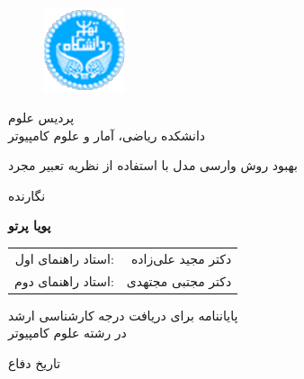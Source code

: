 \documentclass[12pt]{report}
\begin{document}

\begin{figure}
\centering
\includegraphics[height=2.5cm]{UT-Logo.pdf}
\end{figure}

\begin{center}
پردیس علوم
\\
دانشکده ریاضی، آمار و علوم کامپیوتر
\end{center}

\begin{center}
\end{center}

\begin{center}
\huge{بهبود روش وارسی مدل با استفاده از نظریه تعبیر مجرد}
\end{center}

\begin{center}
\end{center}

\begin{center}
نگارنده
\end{center}
\begin{center}
\textbf{
پویا پرتو
}
\end{center}

\begin{center}
\begin{tabular}{rr}
استاد راهنمای اول:& دکتر مجید علی‌زاده
\\
استاد راهنمای دوم: & دکتر مجتبی مجتهدی
\\

\end{tabular}
\end{center}

\vspace{3cm}
\begin{center}
پایاننامه برای دریافت درجه کارشناسی ارشد
\\
در رشته علوم کامپیوتر
\end{center}

\begin{center}
تاریخ دفاع
\end{center}

\pagestyle{empty}
\pagenumbering{}
\end{document}
